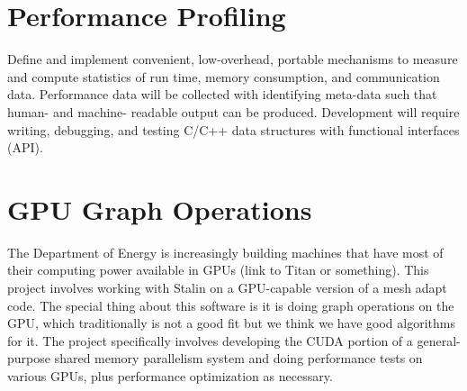 \documentclass[12pt]{article}
\begin{document}
\section{Performance Profiling}
Define and implement convenient, low-overhead, portable mechanisms to measure
and compute statistics of run time, memory consumption, and communication data.
Performance data will be collected with identifying meta-data such that human-
and machine- readable output can be produced.  Development will require
writing, debugging, and testing C/C++ data structures with functional
interfaces (API).

\section{GPU Graph Operations}
The Department of Energy is increasingly building machines that have most of
their computing power available in GPUs (link to Titan or something). This
project involves working with Stalin on a GPU-capable version of a mesh adapt
code. The special thing about this software is it is doing graph operations on
the GPU, which traditionally is not a good fit but we think we have good
algorithms for it. The project specifically involves developing the CUDA
portion of a general-purpose shared memory parallelism system and doing
performance tests on various GPUs, plus performance optimization as necessary.
\end{document}
